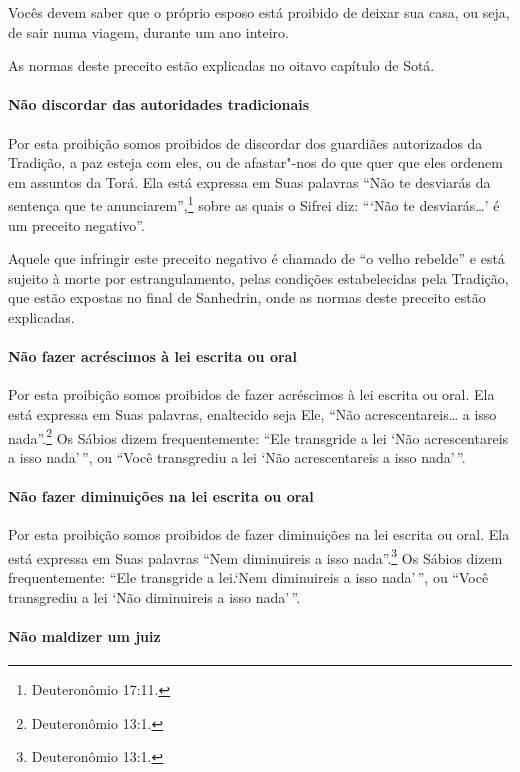 \begin{multicols}{2}
Vocês devem saber que o próprio esposo está proibido de deixar sua casa,
ou seja, de sair numa viagem, durante um ano inteiro.

As normas deste preceito estão explicadas no oitavo capítulo de Sotá\starr.

\paragraph{Não discordar das autoridades tradicionais}

Por esta proibição somos proibidos de discordar dos guardiães
autorizados da Tradição, a paz esteja com eles, ou de afastar"-nos do que
quer que eles ordenem em assuntos da Torá\starr. Ela está expressa em Suas
palavras ``Não te desviarás da sentença que te anunciarem'',\footnote{Deuteronômio 17:11.} sobre as quais o Sifrei\starr{} diz: ```Não te
desviarás\ldots{}' é um preceito negativo''.

Aquele que infringir este preceito negativo é chamado de ``o velho
rebelde'' e está sujeito à morte por estrangulamento, pelas condições
estabelecidas pela Tradição, que estão expostas no final de Sanhedrin\starr,
onde as normas deste preceito estão explicadas.

\paragraph{Não fazer acréscimos à lei escrita ou oral}

Por esta proibição somos proibidos de fazer acréscimos à lei escrita ou
oral. Ela está expressa em Suas palavras, enaltecido seja Ele, ``Não
acrescentareis\ldots{} a isso nada''.\footnote{Deuteronômio 13:1.} Os Sábios dizem
frequentemente: ``Ele transgride a lei `Não acrescentareis a isso
nada'\,'', ou ``Você transgrediu a lei `Não acrescentareis a isso nada'\,''.

\paragraph{Não fazer diminuições na lei escrita ou oral}

Por esta proibição somos proibidos de fazer diminuições na lei escrita
ou oral. Ela está expressa em Suas palavras ``Nem diminuireis a isso
nada''.\footnote{Deuteronômio 13:1.} Os Sábios dizem frequentemente: ``Ele
transgride a lei.`Nem diminuireis a isso nada'\,'', ou ``Você transgrediu
a lei `Não diminuireis a isso nada'\,''.

\paragraph{Não maldizer um juiz}


\end{multicols}
